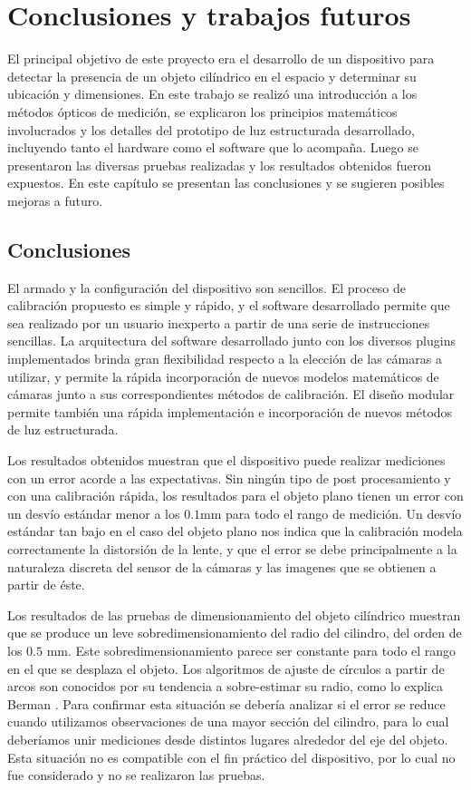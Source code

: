 \chapter{Conclusiones y trabajos futuros}\label{ch:conclusiones}

El principal objetivo de este proyecto era el desarrollo de un dispositivo para detectar la presencia de un objeto cilíndrico en el espacio y determinar su ubicación y dimensiones. En este trabajo se realizó una introducción a los métodos ópticos de medición, se explicaron los principios matemáticos involucrados y los detalles del prototipo de luz estructurada desarrollado, incluyendo tanto el hardware como el software que lo acompaña. Luego se presentaron las diversas pruebas realizadas y los resultados obtenidos fueron expuestos.
En este capítulo se presentan las conclusiones y se sugieren posibles mejoras a futuro.

\section{Conclusiones}
El armado y la configuración del dispositivo son sencillos. El proceso de calibración propuesto es simple y rápido, y el software desarrollado permite que sea realizado por un usuario inexperto a partir de una serie de instrucciones sencillas.  La arquitectura del software desarrollado junto con los diversos plugins implementados brinda gran flexibilidad respecto a la elección de las cámaras a utilizar, y permite la rápida incorporación de nuevos modelos matemáticos de cámaras junto a sus correspondientes métodos de calibración. El diseño modular permite también una rápida implementación e incorporación de nuevos métodos de luz estructurada.

Los resultados obtenidos muestran que el dispositivo puede realizar mediciones con un error acorde a las expectativas.
Sin ningún tipo de post procesamiento y con una calibración rápida, los resultados para el objeto plano tienen un error con un desvío estándar menor a los $0.1$mm para todo el rango de medición. Un desvío estándar tan bajo en el caso del objeto plano nos indica que la calibración modela correctamente la distorsión de la lente, y que el error se debe principalmente a la naturaleza discreta del sensor de la cámaras y las imagenes que se obtienen a partir de éste.

Los resultados de las pruebas de dimensionamiento del objeto cilíndrico muestran que se produce un leve sobredimensionamiento del radio del cilindro, del orden de los $0.5$ mm. Este sobredimensionamiento parece ser constante para todo el rango en el que se desplaza el objeto. Los algoritmos de ajuste de círculos a partir de arcos son conocidos por su tendencia a sobre-estimar su radio, como lo explica Berman \cite{berman1989large}. Para confirmar esta situación se debería analizar si el error se reduce cuando utilizamos observaciones de una mayor sección del cilindro, para lo cual deberíamos unir mediciones desde distintos lugares alrededor del eje del objeto. Esta situación no es compatible con el fin práctico del dispositivo, por lo cual no fue considerado y no se realizaron las pruebas.

